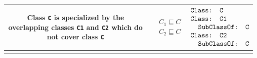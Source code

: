 \documentclass[11pt,final,onecolumn]{report}
\newcommand\umltablespacing{3cm}
\newcommand\dltablespacing{4.5cm}
\newcommand\owlspacing{-1mm}
\begin{document}
\begin{longtable}{|>{\scriptsize}c|>{\scriptsize}l|>{\scriptsize}l|}
\begin{minipage}{\umltablespacing}
      Class \texttt{C} is specialized by the overlapping classes \texttt{C1} and \texttt{C2} which do not cover class \texttt{C}  
     \vspace{2mm}
    \end{minipage}
    &
    \begin{minipage}{\dltablespacing}
       $\begin{aligned}   
	  &C_1 \sqsubseteq C  \\  
	  &C_2 \sqsubseteq C 
       \end{aligned}$     
    \end{minipage}
    &
      $\begin{aligned}
	  &\texttt{Class: C}\\[\owlspacing]
          &\texttt{Class: C1}\\[\owlspacing]
	  &\texttt{\hspace*{0.20cm} SubClassOf: C}\\[\owlspacing]
          &\texttt{Class: C2}\\[\owlspacing]
          &\texttt{\hspace*{0.20cm} SubClassOf: C}	
     \end{aligned}$
     \\\hline       
    \begin{minipage}{\umltablespacing}

\end{minipage}
\end{longtable}
\end{document}
